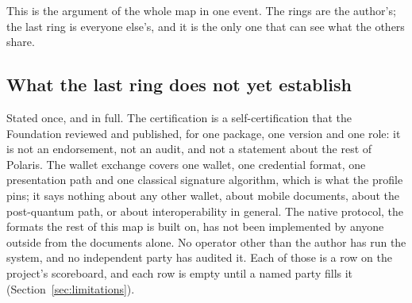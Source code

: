 This is the argument of the whole map in one event. The rings are the author's; the last ring is
everyone else's, and it is the only one that can see what the others share.

\subsection{What the last ring does not yet establish}

Stated once, and in full. The certification is a self-certification that the Foundation reviewed and
published, for one package, one version and one role: it is not an endorsement, not an audit, and not
a statement about the rest of Polaris. The wallet exchange covers one wallet, one credential format,
one presentation path and one classical signature algorithm, which is what the profile pins; it says
nothing about any other wallet, about mobile documents, about the post-quantum path, or about
interoperability in general. The native protocol, the  formats the rest of this map
is built on, has not been implemented by anyone outside from the documents alone. No operator other
than the author has run the system, and no independent party has audited it. Each of those is a row
on the project's scoreboard, and each row is empty until a named party fills it
(Section~\ref{sec:limitations}). \sExt
